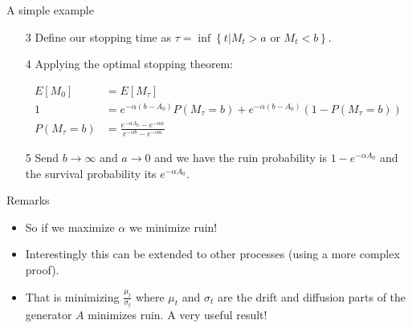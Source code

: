 \documentclass[11pt]{beamer}
\begin{document}
\begin{frame}{ A simple example } 
\begin{enumerate}

\item[3] Define our stopping time as $\tau = \inf\left\lbrace t| M_t>a \text{ or } M_t<b \right\rbrace$. 

\vfill

\item[4] Applying the optimal stopping theorem:

\begin{align*}
E[M_0] &= E[M_\tau] \\
1 &= e^{-\alpha (b-A_0)} P( M_\tau = b ) + e^{-\alpha (b-A_0)} (1-P( M_\tau = b )) \\
P( M_\tau = b ) &= \frac{ e^{ -\alpha A_0 } -  e^{ -\alpha a } }{e^{ -\alpha b } -  e^{ -\alpha a }}
\end{align*}

\vfill

\item[5] Send $b \rightarrow \infty$ and $a \rightarrow 0$ and we have the ruin probability is $1-e^{-\alpha A_0}$ and the survival probability its $e^{-\alpha A_0}$.

\end{enumerate}
\end{frame}
\begin{frame}{Remarks}

\begin{itemize}

\item So if we maximize $\alpha$ we minimize ruin!
 

\vfill

\item Interestingly this can be extended to other processes (using a more complex proof). 

\vfill

\item That is minimizing $\frac{\mu_t}{\sigma_t}$ where $\mu_t$ and $\sigma_t$ are the drift and diffusion parts of the generator $A$ minimizes ruin. A very useful result!

\end{itemize}

\end{frame}
\end{document}
